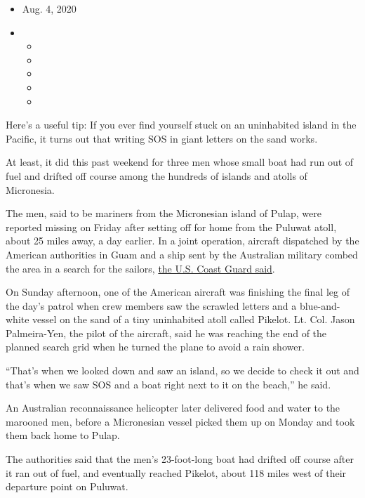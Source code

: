 \begin{itemize}
\item
  Aug. 4, 2020
\item
  \begin{itemize}
  \item
  \item
  \item
  \item
  \item
  \end{itemize}
\end{itemize}

Here's a useful tip: If you ever find yourself stuck on an uninhabited
island in the Pacific, it turns out that writing SOS in giant letters on
the sand works.

At least, it did this past weekend for three men whose small boat had
run out of fuel and drifted off course among the hundreds of islands and
atolls of Micronesia.

The men, said to be mariners from the Micronesian island of Pulap, were
reported missing on Friday after setting off for home from the Puluwat
atoll, about 25 miles away, a day earlier. In a joint operation,
aircraft dispatched by the American authorities in Guam and a ship sent
by the Australian military combed the area in a search for the sailors,
\href{https://www.dvidshub.net/news/375188/coast-guard-partners-rescue-three-stranded-mariners-island-federated-states-micronesia}{the
U.S. Coast Guard said}.

On Sunday afternoon, one of the American aircraft was finishing the
final leg of the day's patrol when crew members saw the scrawled letters
and a blue-and-white vessel on the sand of a tiny uninhabited atoll
called Pikelot. Lt. Col. Jason Palmeira-Yen, the pilot of the aircraft,
said he was reaching the end of the planned search grid when he turned
the plane to avoid a rain shower.

``That's when we looked down and saw an island, so we decide to check it
out and that's when we saw SOS and a boat right next to it on the
beach,'' he said.

An Australian reconnaissance helicopter later delivered food and water
to the marooned men, before a Micronesian vessel picked them up on
Monday and took them back home to Pulap.

The authorities said that the men's 23-foot-long boat had drifted off
course after it ran out of fuel, and eventually reached Pikelot, about
118 miles west of their departure point on Puluwat.

